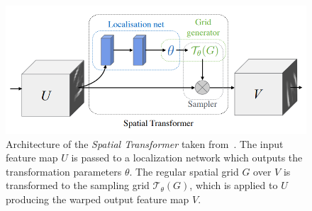 \begin{figure}[h] %
	\centering
	\graphicspath{{images/}{\main/images/}}
	\includegraphics[width=\linewidth]{SpatialTransformer.png} 
	\caption{Architecture of the \emph{Spatial Transformer} taken from~\cite{SpatialTransformer}. The input feature map $U$ is passed to a localization network which outputs the transformation parameters $\theta$. The regular spatial grid $G$ over $V$ is transformed to the sampling grid $\mathcal{T}_\theta(G)$, which is applied to $U$ producing the warped output feature map $V$.}
	\label{fig:SpatialTransformer}
\end{figure}


